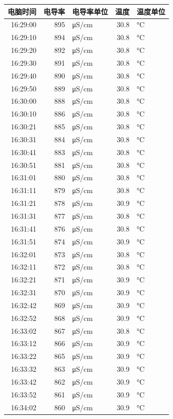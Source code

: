 \documentclass[11pt]{article}
\begin{document}
\begin{enumerate}
\begin{center}
\begin{tabular}{rrlrl}
电脑时间 & 电导率 & 电导率单位 & 温度 & 温度单位\\
\hline
16:29:00 & 895 & μS/cm & 30.8 & °C\\
16:29:10 & 894 & μS/cm & 30.8 & °C\\
16:29:20 & 892 & μS/cm & 30.8 & °C\\
16:29:30 & 891 & μS/cm & 30.8 & °C\\
16:29:40 & 890 & μS/cm & 30.8 & °C\\
16:29:50 & 889 & μS/cm & 30.8 & °C\\
16:30:00 & 888 & μS/cm & 30.8 & °C\\
16:30:10 & 886 & μS/cm & 30.8 & °C\\
16:30:21 & 885 & μS/cm & 30.8 & °C\\
16:30:31 & 884 & μS/cm & 30.8 & °C\\
16:30:41 & 883 & μS/cm & 30.8 & °C\\
16:30:51 & 881 & μS/cm & 30.8 & °C\\
16:31:01 & 880 & μS/cm & 30.8 & °C\\
16:31:11 & 879 & μS/cm & 30.8 & °C\\
16:31:21 & 878 & μS/cm & 30.9 & °C\\
16:31:31 & 877 & μS/cm & 30.8 & °C\\
16:31:41 & 876 & μS/cm & 30.8 & °C\\
16:31:51 & 874 & μS/cm & 30.9 & °C\\
16:32:01 & 873 & μS/cm & 30.8 & °C\\
16:32:11 & 872 & μS/cm & 30.8 & °C\\
16:32:21 & 871 & μS/cm & 30.9 & °C\\
16:32:31 & 870 & μS/cm & 30.9 & °C\\
16:32:42 & 869 & μS/cm & 30.9 & °C\\
16:32:52 & 868 & μS/cm & 30.9 & °C\\
16:33:02 & 867 & μS/cm & 30.8 & °C\\
16:33:12 & 866 & μS/cm & 30.9 & °C\\
16:33:22 & 865 & μS/cm & 30.9 & °C\\
16:33:32 & 863 & μS/cm & 30.9 & °C\\
16:33:42 & 862 & μS/cm & 30.9 & °C\\
16:33:52 & 861 & μS/cm & 30.9 & °C\\
16:34:02 & 860 & μS/cm & 30.9 & °C\\

\end{tabular}
\end{center}
\end{enumerate}
\end{document}

